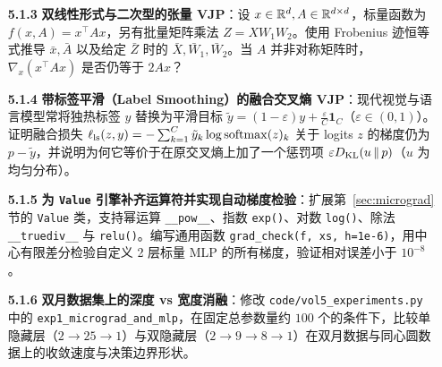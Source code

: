 
\begin{enumerate}
  \item[\textbf{5.1.3}] \textbf{双线性形式与二次型的张量 VJP}：设 $x \in \mathbb{R}^d, A \in \mathbb{R}^{d \times d}$，标量函数为 $f(x, A) = x^\top A x$，另有批量矩阵乘法 $Z = X W_1 W_2$。使用 Frobenius 迹恒等式推导 $\bar{x}, \bar{A}$ 以及给定 $\bar{Z}$ 时的 $\bar{X}, \bar{W}_1, \bar{W}_2$。当 $A$ 并非对称矩阵时，$\nabla_x (x^\top A x)$ 是否仍等于 $2Ax$？

  \item[\textbf{5.1.4}] \textbf{带标签平滑（Label Smoothing）的融合交叉熵 VJP}：现代视觉与语言模型常将独热标签 $y$ 替换为平滑目标 $\tilde{y} = (1-\varepsilon)y + \frac{\varepsilon}{C}\mathbf{1}_C$（$\varepsilon \in (0,1)$）。证明融合损失 $\ell_{\text{ls}}(z, y) = -\sum_{k=1}^C \tilde{y}_k \log \operatorname{softmax}(z)_k$ 关于 logits $z$ 的梯度仍为 $p - \tilde{y}$，并说明为何它等价于在原交叉熵上加了一个惩罚项 $\varepsilon D_{\mathrm{KL}}(u \,\|\, p)$（$u$ 为均匀分布）。
\end{enumerate}


\begin{enumerate}
  \item[\textbf{5.1.5}] \textbf{为 \texttt{Value} 引擎补齐运算符并实现自动梯度检验}：扩展第~\ref{sec:micrograd} 节的 \texttt{Value} 类，支持幂运算 \texttt{\_\_pow\_\_}、指数 \texttt{exp()}、对数 \texttt{log()}、除法 \texttt{\_\_truediv\_\_} 与 \texttt{relu()}。编写通用函数 \texttt{grad\_check(f, xs, h=1e-6)}，用中心有限差分检验自定义 2 层标量 MLP 的所有梯度，验证相对误差小于 $10^{-8}$。

  \item[\textbf{5.1.6}] \textbf{双月数据集上的深度 vs 宽度消融}：修改 \texttt{code/vol5\_experiments.py} 中的 \texttt{exp1\_micrograd\_and\_mlp}，在固定总参数量约 $100$ 个的条件下，比较单隐藏层（$2 \to 25 \to 1$）与双隐藏层（$2 \to 9 \to 8 \to 1$）在双月数据与同心圆数据上的收敛速度与决策边界形状。
\end{enumerate}

